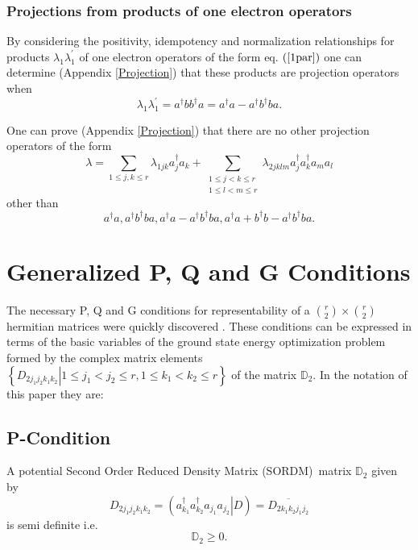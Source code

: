 \documentclass[aps,preprint,amsfonts,amssymb,showpacs,showkeys]{revtex4}%
\begin{document}
\subsubsection{Projections from products of one electron operators}

By considering the positivity, idempotency and normalization relationships for
products $\lambda_{1}\lambda_{1}^{\prime}$ of one electron operators of the
form eq. $\left(  \ref{1par}\right)  $ one can determine (Appendix
\ref{Projection}) that these products are projection operators when
\begin{equation}
\lambda_{1}\lambda_{1}^{\prime}=a^{\dagger}bb^{\dagger}a=a^{\dagger
}a-a^{\dagger}b^{\dagger}ba.
\end{equation}


One can prove (Appendix \ref{Projection}) that there are no other projection
operators of the form
\begin{equation}
\lambda=\sum_{1\leq j,k\leq r}\lambda_{1jk}a_{j}^{\dagger}a_{k}+\sum
_{\substack{1\leq j<k\leq r\\1\leq l<m\leq r}}\lambda_{2jklm}a_{j}^{\dagger
}a_{k}^{\dagger}a_{m}a_{l}%
\end{equation}
other than
\begin{equation}
a^{\dagger}a,a^{\dagger}b^{\dagger}ba,a^{\dagger}a-a^{\dagger}b^{\dagger
}ba,a^{\dagger}a+b^{\dagger}b-a^{\dagger}b^{\dagger}ba.
\end{equation}


\section{Generalized P, Q and G Conditions \label{PQG}}

The necessary P, Q and G conditions for representability of a $\binom{r}%
{2}\times\binom{r}{2}$ hermitian matrices were quickly discovered \cite{PQG}.
These conditions can be expressed in terms of the basic variables of the
ground state energy optimization problem formed by the complex matrix elements
$\left\{  \left.  D_{2j_{1}j_{2}k_{1}k_{2}}\right\vert 1\leq j_{1}<j_{2}\leq
r,1\leq k_{1}<k_{2}\leq r\right\}  $ of the matrix $\mathbb{D}_{2}$. In the
notation of this paper they are:

\subsection{P-Condition}

A potential Second Order Reduced Density Matrix (SORDM)\ matrix $\mathbb{D}%
_{2}$ given by
\begin{equation}
D_{2j_{1}j_{2}k_{1}k_{2}}=\left(  \left.  a_{k_{1}}^{\dagger}a_{k_{2}%
}^{\dagger}a_{j_{1}}a_{j_{2}}\right\vert D\right)  =\overline{D_{2k_{1}%
k_{2}j_{1}j_{2}}}%
\end{equation}
is semi definite i.e.
\begin{equation}
\mathbb{D}_{2}\geq0.
\end{equation}
\end{document}
